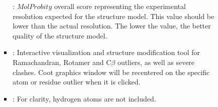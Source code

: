 \begin{itemize}
\begin{itemize}
\begin{itemize}
\begin{itemize}
            : $MolProbity$ overall score representing the experimental resolution expected for the structure model. This value should be lower than the actual resolution. The lower the value, the better quality of the structure model.\\
           
           \item {}: Interactive visualization and structure modification tool for Ramachandran, Rotamer and C{$\beta$} outliers, as well as severe clashes. Coot graphics window will be recentered on the specific atom or residue outlier when it is clicked.
           
           \item {}: For clarity, hydrogen atoms are not included.
          \end{itemize}
          

\end{itemize}
\end{itemize}
\end{itemize}
